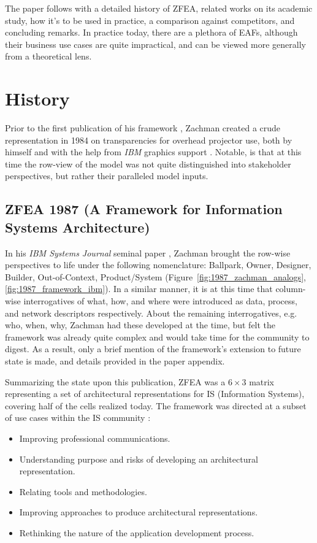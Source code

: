 \documentclass[12pt,conference]{IEEEtran}
\begin{document}
The paper follows with a detailed history of ZFEA, related works on its academic study, how it's to be used in practice, a comparison against competitors, and concluding remarks.
In practice today, there are a plethora of EAFs, although their business use cases are quite impractical, and can be viewed more generally from a theoretical lens.

\section{History}
Prior to the first publication of his framework \cite{zachman_ibm_1987}, Zachman created a crude representation in 1984 on transparencies for overhead projector use, both by himself and with the help from \emph{IBM} graphics support \cite{Zachman_Evolution}.
Notable, is that at this time the row-view of the model was not quite distinguished into stakeholder perspectives, but rather their paralleled model inputs.

\subsection{ZFEA 1987 (A Framework for Information Systems Architecture)}
In his \emph{IBM Systems Journal} seminal paper \cite{zachman_ibm_1987}, Zachman brought the row-wise perspectives to life under the following nomenclature: Ballpark, Owner, Designer, Builder, Out-of-Context, Product/System (Figure~\ref{fig:1987_zachman_analogs},\ref{fig:1987_framework_ibm}).
In a similar manner, it is at this time that column-wise interrogatives of what, how, and where were introduced as data, process, and network descriptors respectively.
About the remaining interrogatives, e.g. who, when, why, Zachman had these developed at the time, but felt the framework was already quite complex and would take time for the community to digest.
As a result, only a brief mention of the framework's extension to future state is made, and details provided in the paper appendix.

Summarizing the state upon this publication, ZFEA was a $6 \times 3$ matrix representing a set of architectural representations for IS (Information Systems), covering half of the cells realized today.
The framework was directed at a subset of use cases within the IS community \cite{zachman_ibm_1987}:
\begin{itemize}
    \item Improving professional communications.
    \item Understanding purpose and risks of developing an architectural representation.
    \item Relating tools and methodologies.
    \item Improving approaches to produce architectural representations.
    \item Rethinking the nature of the application development process.
\end{itemize}
\end{document}
